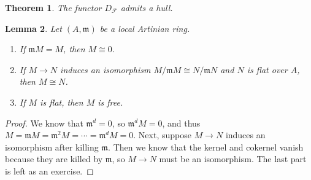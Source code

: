 \documentclass[leqno, openany]{memoir}
\newtheorem{thm}{Theorem}[section]
\newtheorem{lem}[thm]{Lemma}
\theoremstyle{definition}
\theoremstyle{remark}
\theoremstyle{plain}
\theoremstyle{definition}
\theoremstyle{remark}
\newcommand{\mc}[1]{\mathcal{#1}}
\newcommand{\mf}[1]{\mathfrak{#1}}
\begin{document}
\begin{thm}
    The functor $D_{\mc{F}}$ admits a hull.
\end{thm}

\begin{lem}
    Let $(A, \mf{m})$ be a local Artinian ring.
    \begin{enumerate}
        \item If $\mf{m} M = M$, then $M \cong 0$.
        \item If $M \to N$ induces an isomorphism $M/\mf{m} M \cong N/\mf{m}N$ and $N$ is flat over $A$, then $M \cong N$.
        \item If $M$ is flat, then $M$ is free.
    \end{enumerate}
\end{lem}

\begin{proof}
    We know that $\mf{m}^d = 0$, so $\mf{m}^d M = 0$, and thus $M = \mf{m} M = \mf{m}^2 M = \cdots = \mf{m}^d M = 0$. Next, suppose $M \to N$ induces an isomorphism after killing $\mf{m}$. Then we know that the kernel and cokernel vanish because they are killed by $\mf{m}$, so $M \to N$ must be an isomorphism. The last part is left as an exercise.
\end{proof}
\end{document}
